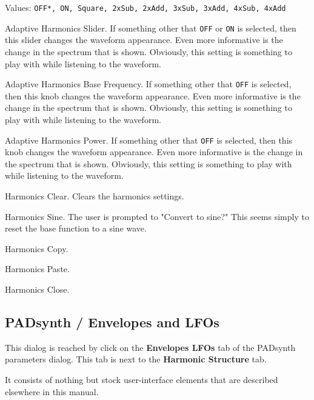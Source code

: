    Values: \texttt{OFF*, ON, Square, 2xSub, 2xAdd, 3xSub, 3xAdd, 4xSub, 4xAdd}

   Adaptive Harmonics Slider.
   If something other that \texttt{OFF} or \texttt{ON} is selected,
   then this slider changes the waveform appearance.
   Even more informative is the change in the spectrum that is shown.
   Obviously, this setting is something to play with while listening to the
   waveform.

   Adaptive Harmonics Base Frequency.
   If something other that \texttt{OFF} is selected,
   then this knob changes the waveform appearance.
   Even more informative is the change in the spectrum that is shown.
   Obviously, this setting is something to play with while listening to the
   waveform.

   Adaptive Harmonics Power.
   If something other that \texttt{OFF} is selected,
   then this knob changes the waveform appearance.
   Even more informative is the change in the spectrum that is shown.
   Obviously, this setting is something to play with while listening to the
   waveform.

   Harmonics Clear.
   Clears the harmonics settings.

   Harmonics Sine.  
   The user is prompted to "Convert to sine?"
   This seems simply to reset the base function to a sine wave.

   Harmonics Copy.

   Harmonics Paste.

   Harmonics Close.

\subsection{PADsynth / Envelopes and LFOs}
\label{subsec:padsynth_envelopes_lfos}
   
   This dialog is reached by click on the \textbf{Envelopes LFOs}
   tab of the PADsynth parameters dialog.  This tab is next to the
   \textbf{Harmonic Structure} tab.

   It consists of nothing but stock user-interface elements that are described
   elsewhere in this manual.

